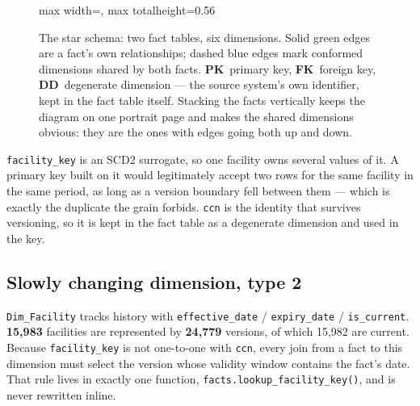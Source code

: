 \documentclass[11pt,a4paper]{article}
\newcommand{\code}[1]{\texttt{#1}}
\newcommand{\PK}{\textcolor{dw}{\textbf{PK}}}
\newcommand{\FK}{\textcolor{src}{\textbf{FK}}}
\newcommand{\DD}{\textcolor{muted}{\textbf{DD}}}
\begin{document}
\begin{figure}[tbp]
\begin{adjustbox}{max width=\linewidth, max totalheight=0.56\textheight}
\end{adjustbox}
\caption{The star schema: two fact tables, six dimensions. Solid green edges are
a fact's own relationships; dashed blue edges mark conformed dimensions shared
by both facts. \PK\ primary key, \FK\ foreign key, \DD\ degenerate dimension —
the source system's own identifier, kept in the fact table itself. Stacking the
facts vertically keeps the diagram on one portrait page and makes the shared
dimensions obvious: they are the ones with edges going both up and down.}
\end{figure}

\begin{warnbox}[title={Fact 1 is keyed on \code{ccn}, not on \code{facility\_key}}]
\code{facility\_key} is an SCD2 surrogate, so one facility owns several values
of it. A primary key built on it would legitimately accept two rows for the
same facility in the same period, as long as a version boundary fell between
them — which is exactly the duplicate the grain forbids. \code{ccn} is the
identity that survives versioning, so it is kept in the fact table as a
degenerate dimension and used in the key.
\end{warnbox}

\subsection{Slowly changing dimension, type 2}

\code{Dim\_Facility} tracks history with \code{effective\_date} /
\code{expiry\_date} / \code{is\_current}. \textbf{15{,}983} facilities are
represented by \textbf{24{,}779} versions, of which 15{,}982 are current.
Because \code{facility\_key} is not one-to-one with \code{ccn}, every join from
a fact to this dimension must select the version whose validity window contains
the fact's date. That rule lives in exactly one function,
\code{facts.lookup\_facility\_key()}, and is never rewritten inline.
\end{document}
